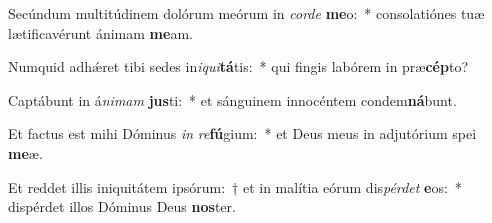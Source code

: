 \item Secúndum multitúdinem dolórum meórum in \textit{cor}\textit{de} \textbf{me}o:~* consolatiónes tuæ lætificavérunt ánimam \textbf{me}am.
\item Numquid adhǽret tibi sedes in\textit{i}\textit{qui}\textbf{tá}tis:~* qui fingis labórem in præ\textbf{cép}to?
\item Captábunt in á\textit{ni}\textit{mam} \textbf{jus}ti:~* et sánguinem innocéntem condem\textbf{ná}bunt.
\item Et factus est mihi Dóminus \textit{in} \textit{re}\textbf{fú}gium:~* et Deus meus in adjutórium spei \textbf{me}æ.
\item Et reddet illis iniquitátem ipsórum:~† et in malítia eórum dis\textit{pér}\textit{det} \textbf{e}os:~* dispérdet illos Dóminus Deus \textbf{nos}ter.

